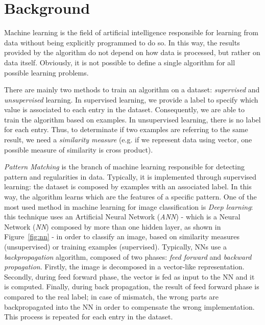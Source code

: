 \section{Background}
\label{sec:background}

Machine learning is the field of artificial intelligence responsible for 
learning from data without being explicitly programmed to do so. In this way, 
the results provided by the algorithm do not depend on how data is processed, 
but rather on data itself. Obviously, it is not possible to define a single 
algorithm for all possible learning problems.

There are mainly two methods to train an algorithm on a dataset: 
\textit{supervised} and \textit{unsupervised} learning. In supervised learning, 
we provide a label to specify which value is associated to each entry in the 
dataset. Consequently, we are able to train the algorithm based on examples. 
In unsupervised learning, there is no label for each entry. Thus, to 
determinate if two examples are referring to the same result, we need a 
\textit{similarity measure} (e.g. if we represent data using vector, one 
possible measure of similarity is cross product).

\textit{Pattern Matching} is the branch of machine learning responsible for 
detecting pattern and regularities in data. Typically, it is implemented 
through supervised learning: the dataset is composed by examples with an 
associated label. In this way, the algorithm learns which are the features of a 
specific pattern.
One of the most used method in machine learning for image classification is 
\textit{Deep learning}: this technique uses an Artificial Neural Network 
(\textit{ANN}) - which is a Neural Network (\textit{NN}) composed by more than 
one hidden layer, as shown in Figure~\ref{fig:nn} - in order to classify an 
image, based on similarity measures (unsupervised) or training examples 
(supervised). Typically, NNs use a \textit{backpropagation} algorithm, composed 
of two phases: \textit{feed forward} and \textit{backward propagation}. Firstly, 
the image is decomposed in a vector-like representation. Secondly, during feed 
forward phase, the vector is fed as input to the NN and it is computed. Finally, 
during back propagation, the result of feed forward phase is compared to the 
real label; in case of mismatch, the wrong parts are backpropagated into the NN 
in order to compensate the wrong implementation. This process is repeated for 
each entry in the dataset.


